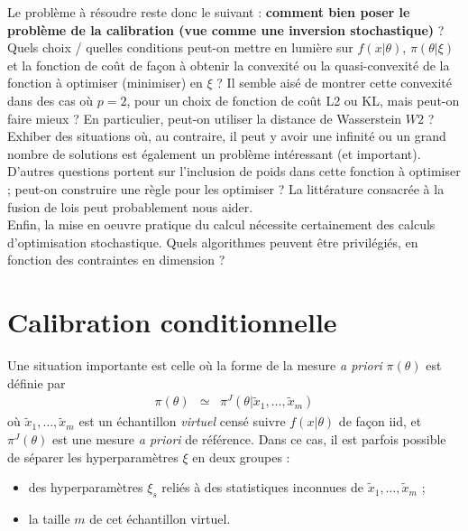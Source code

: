 \documentclass[10pt]{article}
\newcommand{\1}{\mathbbm{1}}
\begin{document}
Le probl\`eme \`a r\'esoudre reste donc le suivant : {\bf comment bien poser le probl\`eme de la calibration (vue comme une inversion stochastique)} ?  Quels choix /  quelles conditions peut-on mettre en lumi\`ere sur $f(x|\theta)$, $\pi(\theta|\xi)$ et la fonction de co\^ut de fa\c con \`a obtenir la convexit\'e ou la quasi-convexit\'e de la fonction \`a optimiser (minimiser) en $\xi$ ? Il semble ais\'e de montrer cette convexit\'e dans des cas o\`u $p=2$, pour un choix de fonction de co\^ut L2 ou KL, mais peut-on faire mieux ? En particulier, peut-on utiliser la distance de Wasserstein $W2$ ?\\

Exhiber des situations o\`u, au contraire, il peut y avoir une infinit\'e ou un grand nombre de solutions est \'egalement un probl\`eme int\'eressant (et important). \\

D'autres questions portent sur l'inclusion de poids dans cette fonction \`a optimiser ; peut-on construire une r\`egle pour les optimiser ? La litt\'erature consacr\'ee \`a la fusion de lois peut probablement nous aider. \\

Enfin, la mise en oeuvre pratique du calcul n\'ecessite certainement des calculs d'optimisation stochastique. Quels algorithmes peuvent \^etre privil\'egi\'es, en fonction des contraintes en dimension ? 



\section{Calibration conditionnelle}

Une situation importante est celle o\`u la forme de la mesure {\it a priori} $\pi(\theta)$ est d\'efinie par
\begin{eqnarray*}
\pi(\theta) & \simeq & \pi^J(\theta|\tilde{x}_1,\ldots,\tilde{x}_m)
\end{eqnarray*}
o\`u $\tilde{x}_1,\ldots,\tilde{x}_m$ est un \'echantillon {\it virtuel} cens\'e suivre $f(x|\theta)$ de fa\c con iid, et $\pi^J(\theta)$ est une mesure {\it a priori} de r\'ef\'erence. Dans ce cas,  il est parfois possible de s\'eparer 
les hyperparam\`etres $\xi$ en deux groupes :
\begin{itemize}
    \item des hyperparam\`etres $\xi_s$ reli\'es \`a des statistiques inconnues de $\tilde{x}_1,\ldots,\tilde{x}_m$ ;
    \item la taille $m$  de cet \'echantillon virtuel.\\
\end{itemize}
\end{document}
